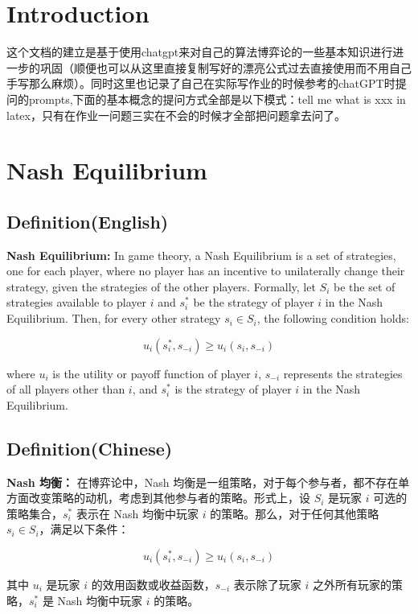 \documentclass{article}
\begin{document}
\section{Introduction}

这个文档的建立是基于使用chatgpt来对自己的算法博弈论的一些基本知识进行进一步的巩固（顺便也可以从这里直接复制写好的漂亮公式过去直接使用而不用自己手写那么麻烦）。同时这里也记录了自己在实际写作业的时候参考的chatGPT时提问的prompts,下面的基本概念的提问方式全部是以下模式：tell me what is xxx in latex，只有在作业一问题三实在不会的时候才全部把问题拿去问了。


\section{Nash Equilibrium}

\subsection{Definition(English)}

\textbf{Nash Equilibrium:} In game theory, a Nash Equilibrium is a set of strategies, one for each player, where no player has an incentive to unilaterally change their strategy, given the strategies of the other players. Formally, let \(S_i\) be the set of strategies available to player \(i\) and \(s_i^*\) be the strategy of player \(i\) in the Nash Equilibrium. Then, for every other strategy \(s_i \in S_i\), the following condition holds:

\[ u_i(s_i^*, s_{-i}) \geq u_i(s_i, s_{-i}) \]

where \(u_i\) is the utility or payoff function of player \(i\), \(s_{-i}\) represents the strategies of all players other than \(i\), and \(s_i^*\) is the strategy of player \(i\) in the Nash Equilibrium.

\subsection{Definition(Chinese)}

\textbf{Nash 均衡：} 在博弈论中，Nash 均衡是一组策略，对于每个参与者，都不存在单方面改变策略的动机，考虑到其他参与者的策略。形式上，设 \(S_i\) 是玩家 \(i\) 可选的策略集合，\(s_i^*\) 表示在 Nash 均衡中玩家 \(i\) 的策略。那么，对于任何其他策略 \(s_i \in S_i\)，满足以下条件：

\[ u_i(s_i^*, s_{-i}) \geq u_i(s_i, s_{-i}) \]

其中 \(u_i\) 是玩家 \(i\) 的效用函数或收益函数，\(s_{-i}\) 表示除了玩家 \(i\) 之外所有玩家的策略，\(s_i^*\) 是 Nash 均衡中玩家 \(i\) 的策略。
\end{document}
